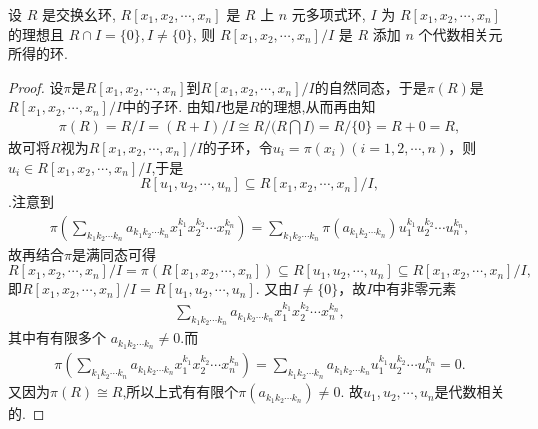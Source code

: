 \documentclass[../../main.tex]{subfiles}%
\begin{document}
\begin{corollary}
设 \( R \) 是交换幺环, \( R[x_1, x_2, \cdots, x_n] \) 是 \( R \) 上 \( n \) 元多项式环, \( I \) 为 \( R[x_1, x_2, \cdots, x_n] \) 的理想且 \( R \cap I = \{0\}, I \neq \{0\} \), 则 \( R[x_1, x_2, \cdots, x_n]/I \) 是 \( R \) 添加 \( n \) 个代数相关元所得的环.
\end{corollary}
\begin{proof}

设$\pi$是$R[x_1, x_2, \cdots, x_n]$到$R[x_1, x_2, \cdots, x_n]/I$的自然同态，于是$\pi(R)$是$R[x_1, x_2, \cdots, x_n]/I$中的子环. 由知$I$也是$R$的理想,从而再由知
\begin{align*}
\pi (R)=R/I=\left( R+I \right) /I\cong R/(R\bigcap{I)}=R/\{0\}=R+0=R,
\end{align*}
故可将$R$视为$R[x_1, x_2, \cdots, x_n]/I$的子环，令$u_i=\pi(x_i)(i=1,2,\cdots,n)$，则$u_i\in R[x_1, x_2, \cdots, x_n]/I$,于是$$R[u_1,u_2,\cdots ,u_n]\subseteq R[x_1, x_2, \cdots, x_n]/I,$$.注意到
\begin{align*}
\pi \left( \sum_{k_1k_2\cdots k_n}{a_{k_1k_2\cdots k_n}x_{1}^{k_1}x_{2}^{k_2}}\cdots x_{n}^{k_n} \right) =\sum_{k_1k_2\cdots k_n}{\pi \left( a_{k_1k_2\cdots k_n} \right) u_{1}^{k_1}u_{2}^{k_2}}\cdots u_{n}^{k_n},
\end{align*}
故再结合$\pi$是满同态可得
$$
R[x_1, x_2, \cdots, x_n]/I=\pi(R[x_1, x_2, \cdots, x_n])\subseteq R[u_1,u_2,\cdots ,u_n]\subseteq R[x_1, x_2, \cdots, x_n]/I,
$$
即$R[x_1, x_2, \cdots, x_n]/I=R[u_1,u_2,\cdots ,u_n]$. 又由$I\neq\{0\}$，故$I$中有非零元素
\begin{align*}
\sum_{k_1k_2\cdots k_n}{a_{k_1k_2\cdots k_n}x_{1}^{k_1}x_{2}^{k_2}}\cdots x_{n}^{k_n},
\end{align*}
其中有有限多个 \( a_{k_1 k_2 \cdots k_n} \neq 0 \).而
\begin{align*}
\pi \left( \sum_{k_1k_2\cdots k_n}{a_{k_1k_2\cdots k_n}x_{1}^{k_1}x_{2}^{k_2}}\cdots x_{n}^{k_n} \right) =\sum_{k_1k_2\cdots k_n}{a_{k_1k_2\cdots k_n}u_{1}^{k_1}u_{2}^{k_2}}\cdots u_{n}^{k_n}=0.
\end{align*}
又因为$\pi(R)\cong R$,所以上式有有限个$\pi(a_{k_1 k_2 \cdots k_n})\ne 0$.
故$u_1,u_2,\cdots,u_n$是代数相关的.

\end{proof}
\end{document}
